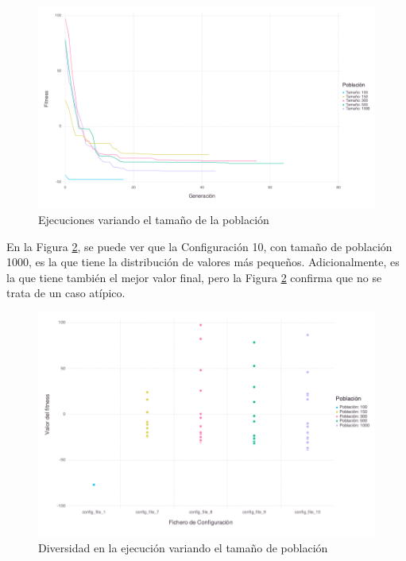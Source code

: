 \begin{figure}[]
	\centering	
	\includegraphics[scale=0.5]{figuras/population_size_variation.png}
	\caption{ Ejecuciones variando el tamaño de la población }
    \label{fig:population_size_variation}
\end{figure}

En la Figura \ref{fig:population_size_box_plots}, se puede ver que la Configuración 10, con tamaño de población 1000, es
la que tiene la distribución de valores más pequeños. Adicionalmente, es la que tiene también el mejor valor final, pero la
Figura \ref{fig:population_size_box_plots} confirma que no se trata de un caso atípico.

\begin{figure}[]
	\centering	
	\includegraphics[scale=0.5]{figuras/Rastrigin_box_plots_p_size.png}
	\caption{ Diversidad en la ejecución variando el tamaño de población }
    \label{fig:population_size_box_plots}
\end{figure}


